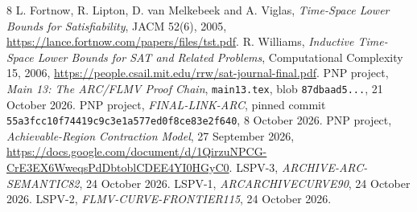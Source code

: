\documentclass[11pt]{article}
\begin{document}
\begin{thebibliography}{8}\small
{} L. Fortnow, R. Lipton, D. van Melkebeek and A. Viglas,
\emph{Time-Space Lower Bounds for Satisfiability}, JACM 52(6), 2005,
\url{https://lance.fortnow.com/papers/files/tst.pdf}.
 R. Williams, \emph{Inductive Time-Space Lower Bounds for
SAT and Related Problems}, Computational Complexity 15, 2006,
\url{https://people.csail.mit.edu/rrw/sat-journal-final.pdf}.
 PNP project, \emph{Main 13: The ARC/FLMV Proof Chain},
\texttt{main13.tex}, blob \texttt{87dbaad5...}, 21 October 2026.
 PNP project, \emph{FINAL-LINK-ARC}, pinned commit
\texttt{55a3fcc10f74419c9c3e1a577ed0f8ce83e2f640}, 8 October 2026.
 PNP project, \emph{Achievable-Region Contraction Model},
27 September 2026,
\url{https://docs.google.com/document/d/1QirzuNPCG-CrE3EX6WweqsPdDbtoblCDEE4YI0HGyC0}.
 LSPV-3, \emph{ARCHIVE-ARC-SEMANTIC82}, 24 October 2026.
 LSPV-1, \emph{ARCARCHIVECURVE90}, 24 October 2026.
 LSPV-2, \emph{FLMV-CURVE-FRONTIER115}, 24 October 2026.
\end{thebibliography}
\end{document}
